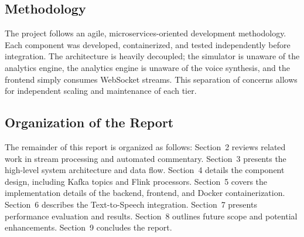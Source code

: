 \subsection{Methodology}
The project follows an agile, microservices-oriented development methodology. Each component was developed, containerized, and tested independently before integration. The architecture is heavily decoupled; the simulator is unaware of the analytics engine, the analytics engine is unaware of the voice synthesis, and the frontend simply consumes WebSocket streams. This separation of concerns allows for independent scaling and maintenance of each tier.

\subsection{Organization of the Report}
The remainder of this report is organized as follows: 
Section~2 reviews related work in stream processing and automated commentary. 
Section~3 presents the high-level system architecture and data flow. 
Section~4 details the component design, including Kafka topics and Flink processors. 
Section~5 covers the implementation details of the backend, frontend, and Docker containerization. 
Section~6 describes the Text-to-Speech integration. 
Section~7 presents performance evaluation and results. 
Section~8 outlines future scope and potential enhancements. 
Section~9 concludes the report.
